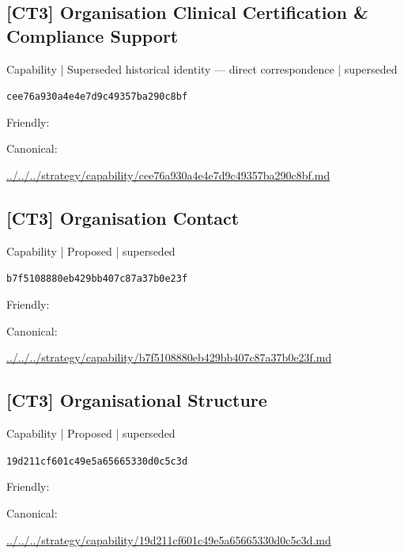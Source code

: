 \documentclass[10pt,a4paper]{article}
\begin{document}
\subsection*{[CT3] Organisation Clinical Certification \& Compliance Support}
{\small Capability | Superseded historical identity — direct correspondence | superseded}\par
\texttt{cee76a930a4e4e7d9c49357ba290c8bf}\par
Friendly: \par
Canonical: \par
{\footnotesize\url{../../../strategy/capability/cee76a930a4e4e7d9c49357ba290c8bf.md}}\par
\subsection*{[CT3] Organisation Contact}
{\small Capability | Proposed | superseded}\par
\texttt{b7f5108880eb429bb407c87a37b0e23f}\par
Friendly: \par
Canonical: \par
{\footnotesize\url{../../../strategy/capability/b7f5108880eb429bb407c87a37b0e23f.md}}\par
\subsection*{[CT3] Organisational Structure}
{\small Capability | Proposed | superseded}\par
\texttt{19d211cf601c49e5a65665330d0c5c3d}\par
Friendly: \par
Canonical: \par
{\footnotesize\url{../../../strategy/capability/19d211cf601c49e5a65665330d0c5c3d.md}}\par
\end{document}
